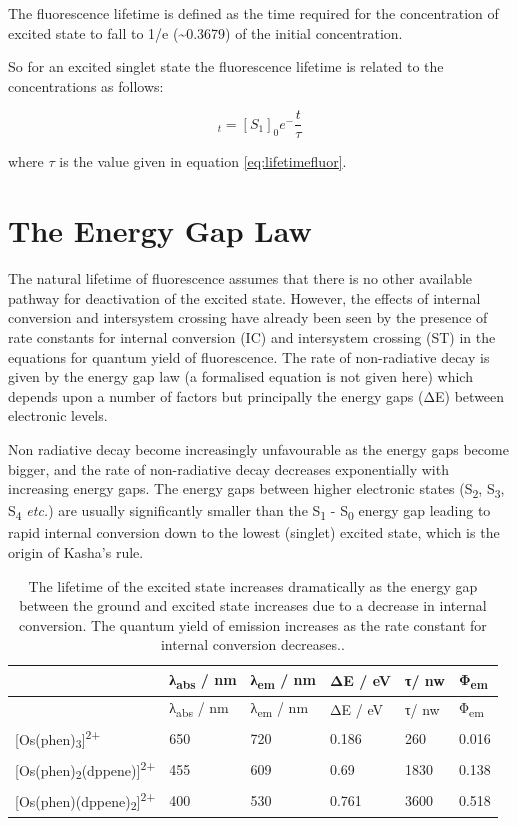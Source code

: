 \documentclass[
]{book}
\begin{document}
The fluorescence lifetime is defined as the time required for the concentration of excited state to fall to 1/e (\textasciitilde0.3679) of the initial concentration.

So for an excited singlet state the fluorescence lifetime is related to the concentrations as follows:

\begin{equation}
[S_1]_t=[S_1]_0e^-{\frac{t}{\tau}}
\label{eq:fluorlifetime}
\end{equation}

where \(\tau\) is the value given in equation \eqref{eq:lifetimefluor}.

\hypertarget{sec:energygap}{%
\section{The Energy Gap Law}\label{sec:energygap}}

The natural lifetime of fluorescence assumes that there is no other available pathway for deactivation of the excited state. However, the effects of internal conversion and intersystem crossing have already been seen by the presence of rate constants for internal conversion (IC) and intersystem crossing (ST) in the equations for quantum yield of fluorescence. The rate of non-radiative decay is given by the energy gap law (a formalised equation is not given here) which depends upon a number of factors but principally the energy gaps (ΔE) between electronic levels.

Non radiative decay become increasingly unfavourable as the energy gaps become bigger, and the rate of non-radiative decay decreases exponentially with increasing energy gaps. The energy gaps between higher electronic states (S\textsubscript{2}, S\textsubscript{3}, S\textsubscript{4} \emph{etc.}) are usually significantly smaller than the S\textsubscript{1} - S\textsubscript{0} energy gap leading to rapid internal conversion down to the lowest (singlet) excited state, which is the origin of Kasha's rule.

\begin{longtable}[]{@{}llllll@{}}
\caption{\label{tab:actinometer} The lifetime of the excited state increases dramatically as the energy gap between the ground and excited state increases due to a decrease in internal conversion. The quantum yield of emission increases as the rate constant for internal conversion decreases..}\tabularnewline
\toprule
& λ\textsubscript{abs} / nm & λ\textsubscript{em} / nm & ΔE / eV & τ/ nw & Φ\textsubscript{em}\tabularnewline
\midrule
\endfirsthead
\toprule
& λ\textsubscript{abs} / nm & λ\textsubscript{em} / nm & ΔE / eV & τ/ nw & Φ\textsubscript{em}\tabularnewline
\midrule
\endhead
{[}Os(phen)\textsubscript{3}{]}\textsuperscript{2+} & 650 & 720 & 0.186 & 260 & 0.016\tabularnewline
{[}Os(phen)\textsubscript{2}(dppene){]}\textsuperscript{2+} & 455 & 609 & 0.69 & 1830 & 0.138\tabularnewline
{[}Os(phen)(dppene)\textsubscript{2}{]}\textsuperscript{2+} & 400 & 530 & 0.761 & 3600 & 0.518\tabularnewline
\bottomrule
\end{longtable}
\end{document}
